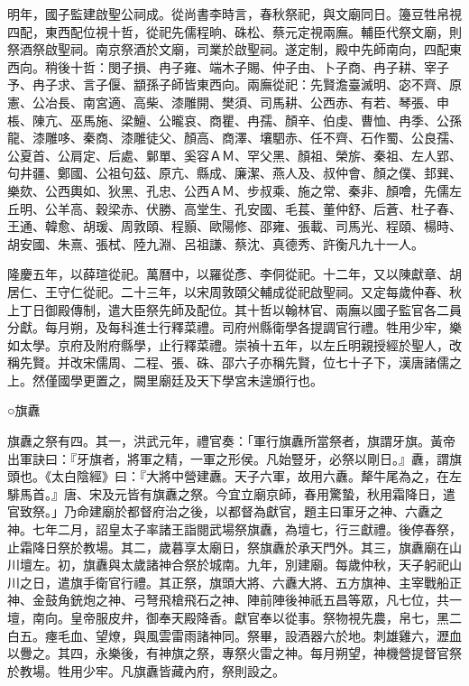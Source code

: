 明年，國子監建啟聖公祠成。從尚書李時言，春秋祭祀，與文廟同日。籩豆牲帛視四配，東西配位視十哲，從祀先儒程晌、硃松、蔡元定視兩廡。輔臣代祭文廟，則祭酒祭啟聖祠。南京祭酒於文廟，司業於啟聖祠。遂定制，殿中先師南向，四配東西向。稍後十哲：閔子損、冉子雍、端木子賜、仲子由、卜子商、冉子耕、宰子予、冉子求、言子偃、顓孫子師皆東西向。兩廡從祀：先賢澹臺滅明、宓不齊、原憲、公冶長、南宮適、高柴、漆雕開、樊須、司馬耕、公西赤、有若、琴張、申棖、陳亢、巫馬施、梁鱣、公曨哀、商瞿、冉孺、顏辛、伯虔、曹恤、冉季、公孫龍、漆雕哆、秦商、漆雕徒父、顏高、商澤、壤駟赤、任不齊、石作蜀、公良孺、公夏首、公肩定、后處、鄡單、奚容ＡＭ、罕父黑、顏祖、榮旂、秦祖、左人郢、句井疆、鄭國、公祖句茲、原亢、縣成、廉潔、燕人及、叔仲會、顏之僕、邽巽、樂欬、公西輿如、狄黑、孔忠、公西ＡＭ、步叔乘、施之常、秦非、顏噲，先儒左丘明、公羊高、穀梁赤、伏勝、高堂生、孔安國、毛萇、董仲舒、后蒼、杜子春、王通、韓愈、胡瑗、周敦頤、程顥、歐陽修、邵雍、張載、司馬光、程頤、楊時、胡安國、朱熹、張栻、陸九淵、呂祖謙、蔡沈、真德秀、許衡凡九十一人。

隆慶五年，以薛瑄從祀。萬曆中，以羅從彥、李侗從祀。十二年，又以陳獻章、胡居仁、王守仁從祀。二十三年，以宋周敦頤父輔成從祀啟聖祠。又定每歲仲春、秋上丁日御殿傳制，遣大臣祭先師及配位。其十哲以翰林官、兩廡以國子監官各二員分獻。每月朔，及每科進士行釋菜禮。司府州縣衛學各提調官行禮。牲用少牢，樂如太學。京府及附府縣學，止行釋菜禮。崇禎十五年，以左丘明親授經於聖人，改稱先賢。并改宋儒周、二程、張、硃、邵六子亦稱先賢，位七十子下，漢唐諸儒之上。然僅國學更置之，闕里廟廷及天下學宮未遑頒行也。

○旗纛

旗纛之祭有四。其一，洪武元年，禮官奏：「軍行旗纛所當祭者，旗謂牙旗。黃帝出軍訣曰：『牙旗者，將軍之精，一軍之形侯。凡始豎牙，必祭以剛日。』纛，謂旗頭也。《太白陰經》曰：『大將中營建纛。天子六軍，故用六纛。犛牛尾為之，在左騑馬首。』唐、宋及元皆有旗纛之祭。今宜立廟京師，春用驚蟄，秋用霜降日，遣官致祭。」乃命建廟於都督府治之後，以都督為獻官，題主曰軍牙之神、六纛之神。七年二月，詔皇太子率諸王詣閱武場祭旗纛，為壇七，行三獻禮。後停春祭，止霜降日祭於教場。其二，歲暮享太廟日，祭旗纛於承天門外。其三，旗纛廟在山川壇左。初，旗纛與太歲諸神合祭於城南。九年，別建廟。每歲仲秋，天子躬祀山川之日，遣旗手衛官行禮。其正祭，旗頭大將、六纛大將、五方旗神、主宰戰船正神、金鼓角銃炮之神、弓弩飛槍飛石之神、陣前陣後神祇五昌等眾，凡七位，共一壇，南向。皇帝服皮弁，御奉天殿降香。獻官奉以從事。祭物視先農，帛七，黑二白五。瘞毛血、望燎，與風雲雷雨諸神同。祭畢，設酒器六於地。刺雄雞六，瀝血以釁之。其四，永樂後，有神旗之祭，專祭火雷之神。每月朔望，神機營提督官祭於教場。牲用少牢。凡旗纛皆藏內府，祭則設之。

